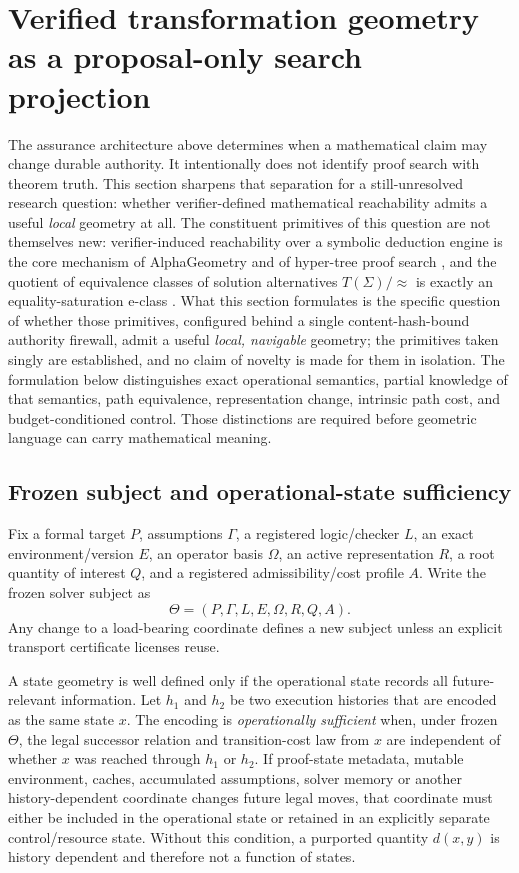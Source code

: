 \section{Verified transformation geometry as a proposal-only search projection}
\label{sec:vtg}

The assurance architecture above determines when a mathematical claim may change durable authority. It intentionally does not identify proof search with theorem truth. This section sharpens that separation for a still-unresolved research question: whether verifier-defined mathematical reachability admits a useful \emph{local} geometry at all. The constituent primitives of this question are not themselves new: verifier-induced reachability over a symbolic deduction engine is the core mechanism of AlphaGeometry \cite{alphageometry2024} and of hyper-tree proof search \cite{htps2022}, and the quotient of equivalence classes of solution alternatives $T(\Sigma)/{\approx}$ is exactly an equality-saturation e-class \cite{egg2021}. What this section formulates is the specific question of whether those primitives, configured behind a single content-hash-bound authority firewall, admit a useful \emph{local, navigable} geometry; the primitives taken singly are established, and no claim of novelty is made for them in isolation. The formulation below distinguishes exact operational semantics, partial knowledge of that semantics, path equivalence, representation change, intrinsic path cost, and budget-conditioned control. Those distinctions are required before geometric language can carry mathematical meaning.

\subsection{Frozen subject and operational-state sufficiency}
Fix a formal target $P$, assumptions $\Gamma$, a registered logic/checker $L$, an exact environment/version $E$, an operator basis $\Omega$, an active representation $R$, a root quantity of interest $Q$, and a registered admissibility/cost profile $A$. Write the frozen solver subject as
\[
\Theta=(P,\Gamma,L,E,\Omega,R,Q,A).
\]
Any change to a load-bearing coordinate defines a new subject unless an explicit transport certificate licenses reuse.

A state geometry is well defined only if the operational state records all future-relevant information. Let $h_1$ and $h_2$ be two execution histories that are encoded as the same state $x$. The encoding is \emph{operationally sufficient} when, under frozen $\Theta$, the legal successor relation and transition-cost law from $x$ are independent of whether $x$ was reached through $h_1$ or $h_2$. If proof-state metadata, mutable environment, caches, accumulated assumptions, solver memory or another history-dependent coordinate changes future legal moves, that coordinate must either be included in the operational state or retained in an explicitly separate control/resource state. Without this condition, a purported quantity $d(x,y)$ is history dependent and therefore not a function of states.

